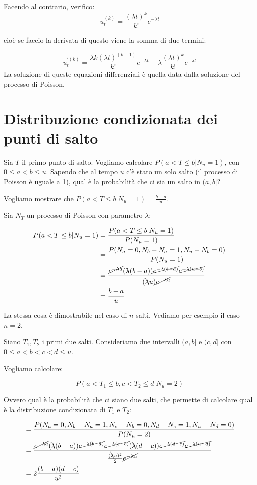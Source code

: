\documentclass[a4paper,12pt]{book}
\begin{document}
Facendo al contrario, verifico:
$$ u_t^{(k)} = \frac{(\lambda t)^k}{k!} e^{-\lambda t} $$

cioè se faccio la derivata di questo viene la somma di due termini:

$$ u_t^{\prime(k)}= \frac{\lambda k (\lambda t)^{(k-1)}}{k!} e^{-\lambda t} -\lambda\frac{(\lambda t)^k}{k!} e^{-\lambda t} $$
La soluzione di queste equazioni differenziali è quella data dalla soluzione del processo di Poisson. 


\section{Distribuzione condizionata dei punti di salto}
Sia $ T $ il primo punto di salto. Vogliamo calcolare $ P( a < T \le b | N_u = 1) $, con $ 0 \le a < b \le u $. Sapendo che al tempo $ u $ c'è stato un solo salto (il processo di Poisson è uguale a 1), qual è la probabilità che ci sia un salto in $ (a,b] $?

Vogliamo mostrare che $ P( a < T \le b | N_u = 1) = \frac{b-a}{u} $.

Sia $ N_T $ un processo di Poisson con parametro $\lambda$:

\begin{align*}
	P( a < T \le b | N_u = 1) & = \frac{P( a < T \le b | N_u = 1)}{P(N_u = 1)} \\
	& = \frac{P(N_a = 0, N_b - N_a = 1, N_u - N_b = 0)}{P(N_u = 1)} \\
	& = \frac{ \cancel{e^{-\lambda a}} (\bcancel{\lambda} (b-a)) \cancel{e^{-\lambda(b-a)}} \cancel{e^{-\lambda(u-b)}}  }{(\bcancel{\lambda} u) \cancel{e^{-\lambda u}}} \\
	& = \frac{b-a}{u}
\end{align*}

La stessa cosa è dimostrabile nel caso di $ n $ salti. Vediamo per esempio il caso $ n = 2 $. 

Siano $ T_1, T_2 $ i primi due salti. Consideriamo due intervalli $ (a,b] $ e $ (c,d] $ con $ 0 \le a < b < c < d \le u $.

Vogliamo calcolare:

$$ P(a < T_1 \le b, c < T_2 \le d | N_u = 2) $$

Ovvero qual è la probabilità che ci siano due salti, che permette di calcolare qual è la distribuzione condizionata di $ T_1 $ e $ T_2 $:

\begin{align*}
	& = \frac{P(N_a = 0, N_b - N_a = 1, N_c - N_b = 0, N_d - N_c  = 1, N_u - N_d  = 0)}{P(N_u = 2)} \\
	& = \frac{  \cancel{e^{-\lambda a}} (\bcancel{\lambda}(b-a)) \cancel{e^{-\lambda(b-a)}} \cancel{e^{-\lambda(c-b)}}    (\bcancel{\lambda}(d-c)) \cancel{e^{-\lambda(d-c)}} \cancel {e^{-\lambda(u-d)}}  } {\frac{(\bcancel{\lambda }u)^2}{2} \cancel{e^{-\lambda u}}} \\ 
	& = 2 \frac{(b-a)(d-c)}{u^2}
\end{align*}
\end{document}
